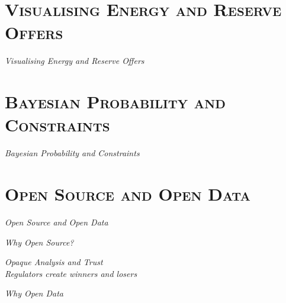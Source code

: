 \documentclass[xcolor=x11names,compress]{beamer}
\renewcommand{\(}{\begin{columns}}
\renewcommand{\)}{\end{columns}}
\newcommand{\<}[1]{\begin{column}{#1}}
\renewcommand{\>}{\end{column}}
\begin{document}
\section{\scshape Visualising Energy and Reserve Offers}
\begin{frame}
\vspace{1.5cm}
\begin{center}
{\Huge\textit{Visualising Energy and Reserve Offers}}
\end{center}
\end{frame}

\section{\scshape Bayesian Probability and Constraints}
\begin{frame}
\vspace{1.5cm}
\begin{center}
{\Huge\textit{Bayesian Probability and Constraints}}
\end{center}
\end{frame}

\section{\scshape Open Source and Open Data}
\begin{frame}
\vspace{1.5cm}
\begin{center}
{\Huge\textit{Open Source and Open Data}}
\end{center}
\end{frame}

\begin{frame}
\vspace{1.5cm}
\begin{center}
{\Huge\textit{Why Open Source?}}
\end{center}
\end{frame}

\begin{frame}
\vspace{1.5cm}
\begin{center}
{\Huge\textit{Opaque Analysis and Trust\\
\vspace{0.5cm}
Regulators create winners and losers}}
\end{center}
\end{frame}

\begin{frame}
\vspace{1.5cm}
\begin{center}
{\Huge\textit{Why Open Data}}
\end{center}
\end{frame}
\end{document}
